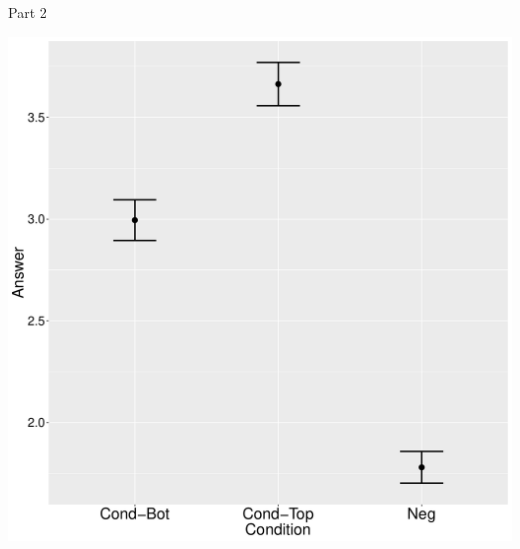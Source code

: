 \documentclass[ignorenonframetext,]{beamer}
\begin{document}
\begin{frame}{Part 2}

\begin{center}
\includegraphics[scale=0.23]{exp1-part_2-errorbars.pdf}
\end{center}

\end{frame}
\end{document}
